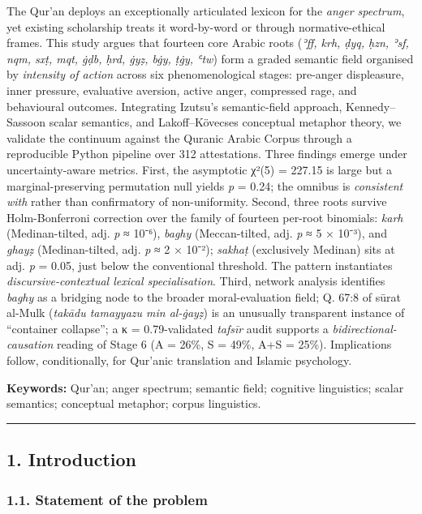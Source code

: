 The Qur'an deploys an exceptionally articulated lexicon for the
\emph{anger spectrum}, yet existing scholarship treats it word-by-word
or through normative-ethical frames. This study argues that fourteen
core Arabic roots (\emph{ʾff, krh, ḍyq, ḥzn, ʾsf, nqm, sxṭ, mqt, ġḍb,
ḥrd, ġyẓ, bġy, ṭġy, ʿtw}) form a graded semantic field organised by
\emph{intensity of action} across six phenomenological stages: pre-anger
displeasure, inner pressure, evaluative aversion, active anger,
compressed rage, and behavioural outcomes. Integrating Izutsu's
semantic-field approach, Kennedy--Sassoon scalar semantics, and
Lakoff--Kövecses conceptual metaphor theory, we validate the continuum
against the Quranic Arabic Corpus through a reproducible Python pipeline
over 312 attestations. Three findings emerge under uncertainty-aware
metrics. First, the asymptotic χ²(5) = 227.15 is large but a
marginal-preserving permutation null yields \emph{p} = 0.24; the omnibus
is \emph{consistent with} rather than confirmatory of non-uniformity.
Second, three roots survive Holm-Bonferroni correction over the family
of fourteen per-root binomials: \emph{karh} (Medinan-tilted, adj.
\emph{p} ≈ 10⁻⁶), \emph{baghy} (Meccan-tilted, adj. \emph{p} ≈ 5 ×
10⁻³), and \emph{ghayẓ} (Medinan-tilted, adj. \emph{p} ≈ 2 × 10⁻²);
\emph{sakhaṭ} (exclusively Medinan) sits at adj. \emph{p} = 0.05, just
below the conventional threshold. The pattern instantiates
\emph{discursive-contextual lexical specialisation}. Third, network
analysis identifies \emph{baghy} as a bridging node to the broader
moral-evaluation field; Q. 67:8 of sūrat al-Mulk (\emph{takādu tamayyazu
min al-ġayẓ}) is an unusually transparent instance of ``container
collapse''; a κ = 0.79-validated \emph{tafsīr} audit supports a
\emph{bidirectional-causation} reading of Stage 6 (A = 26\%, S = 49\%,
A+S = 25\%). Implications follow, conditionally, for Qur'anic
translation and Islamic psychology.

\textbf{Keywords:} Qur'an; anger spectrum; semantic field; cognitive
linguistics; scalar semantics; conceptual metaphor; corpus linguistics.

\begin{center}\rule{0.5\linewidth}{0.5pt}\end{center}

\subsection{1. Introduction}\label{introduction}

\subsubsection{1.1. Statement of the
problem}\label{statement-of-the-problem}

